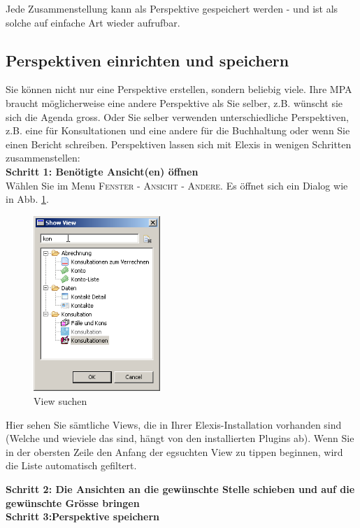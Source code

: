 Jede Zusammenstellung kann als Perspektive gespeichert werden - und ist als
solche auf einfache Art wieder aufrufbar.

\subsection{Perspektiven einrichten und speichern}
Sie können nicht nur eine Perspektive erstellen, sondern beliebig viele. Ihre MPA braucht möglicherweise eine
andere Perspektive als Sie selber, z.B. wünscht sie sich die Agenda gross. Oder Sie selber verwenden unterschiedliche
Perspektiven, z.B. eine für Konsultationen und eine andere für die Buchhaltung oder wenn
Sie einen Bericht schreiben. Perspektiven lassen sich mit Elexis in wenigen Schritten zusammenstellen:\\
\bigskip
\textbf{Schritt 1: Benötigte Ansicht(en) öffnen}\\
Wählen Sie im Menu \textsc{Fenster - Ansicht - Andere}. Es öffnet sich ein Dialog wie in Abb. \ref{fig:cust1}.
 \begin{figure}
    \includegraphics[width=4.8cm]{images/customize1}
    \caption{View suchen}
    \label{fig:cust1}
 \end{figure}
    Hier sehen Sie sämtliche Views, die in Ihrer Elexis-Installation vorhanden sind (Welche und wieviele das sind, hängt von den installierten Plugins ab). Wenn Sie in der obersten Zeile den Anfang der egsuchten View zu tippen beginnen, wird die Liste automatisch gefiltert.\\
 \bigskip
    
\textbf{Schritt 2: Die Ansichten an die gewünschte Stelle schieben und auf die gewünschte Grösse bringen}\\

\bigskip
\textbf{Schritt 3:Perspektive speichern}\\


